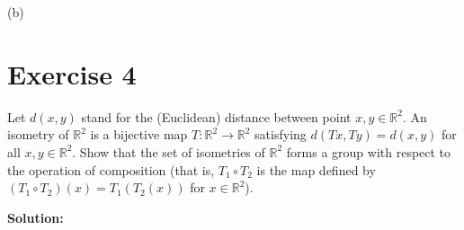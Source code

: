 \documentclass{article}
\begin{document}
(b) 

\newpage

\section*{Exercise 4}

Let $d(x,y)$ stand for the (Euclidean) distance between point $x,y \in \mathbb{R}^2$. An isometry of $\mathbb{R}^2$ is a bijective map $T: \mathbb{R}^2 \to \mathbb{R}^2$ satisfying $d(Tx,Ty)=d(x,y)$ for all $x,y \in \mathbb{R}^2$. Show that the set of isometries of $\mathbb{R}^2$ forms a group with respect to the operation of composition (that is, $T_1 \circ T_2$ is the map defined by $(T_1 \circ T_2)(x)=T_1(T_2(x))$ for $x \in \mathbb{R}^2$).

\textbf{Solution:}
\end{document}
